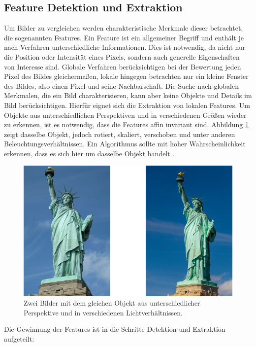 \subsection{Feature Detektion und Extraktion}

Um Bilder zu vergleichen werden charakteristische Merkmale dieser betrachtet, die sogenannten Features. Ein Feature ist ein allgemeiner Begriff und enthält je nach Verfahren unterschiedliche Informationen. Dies ist notwendig, da nicht nur die Position oder Intensität eines Pixels, sondern auch generelle Eigenschaften von Interesse sind. Globale Verfahren berücksichtigen bei der Bewertung jeden Pixel des Bildes gleichermaßen, lokale hingegen betrachten nur ein kleine Fenster des Bildes, also einen Pixel und seine Nachbarschaft. Die Suche nach globalen Merkmalen, die ein Bild charakterisieren, kann aber keine Objekte und Details im Bild berücksichtigen. Hierfür eignet sich die Extraktion von lokalen Features. Um Objekte aus unterschiedlichen Perspektiven und in verschiedenen Größen wieder zu erkennen, ist es notwendig, dass die Features affin invariant sind. Abbildung \ref{img:liberty} zeigt dasselbe Objekt, jedoch rotiert, skaliert, verschoben und unter anderen Beleuchtungsverhältnissen. Ein Algorithmus sollte mit hoher Wahrscheinlichkeit erkennen, dass es sich hier um dasselbe Objekt handelt \cite{ifd2016}.

\begin{figure}
	\centering
	\includegraphics[scale=0.6]{images/liberty.png}
	\caption{Zwei Bilder mit dem gleichen Objekt aus unterschiedlicher Perspektive und in verschiedenen Lichtverhältnissen.}
	\label{img:liberty}
\end{figure}

Die Gewinnung der Features ist in die Schritte Detektion und Extraktion aufgeteilt: 

